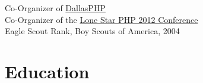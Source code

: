 \documentclass{resume}
\begin{document}
Co-Organizer of \href{http://www.meetup.com/dallasphp/}{DallasPHP}
\\
Co-Organizer of the \href{http://lonestarphp.com/}{Lone Star PHP 2012 Conference}
\\
Eagle Scout Rank, Boy Scouts of America, 2004

\section{Education}

\end{document}
